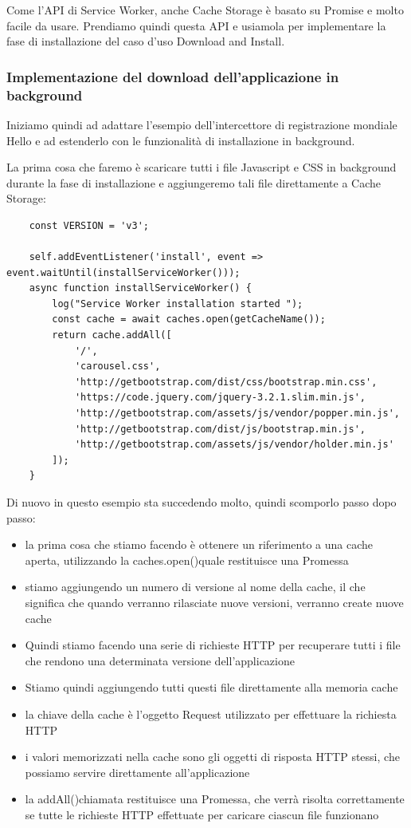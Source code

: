 \documentclass[italian]{article}
\begin{document}
Come l'API di Service Worker, anche Cache Storage è basato su Promise e molto facile da usare. Prendiamo quindi questa API e usiamola per implementare la fase di installazione del caso d'uso Download and Install.
\subsubsection{Implementazione del download dell'applicazione in background}
Iniziamo quindi ad adattare l'esempio dell'intercettore di registrazione mondiale Hello e ad estenderlo con le funzionalità di installazione in background.

La prima cosa che faremo è scaricare tutti i file Javascript e CSS in background durante la fase di installazione e aggiungeremo tali file direttamente a Cache Storage:

\begin{lstlisting}
	const VERSION = 'v3';

	self.addEventListener('install', event => event.waitUntil(installServiceWorker()));
	async function installServiceWorker() {
		log("Service Worker installation started ");
		const cache = await caches.open(getCacheName());
		return cache.addAll([
			'/',
			'carousel.css',
			'http://getbootstrap.com/dist/css/bootstrap.min.css',
			'https://code.jquery.com/jquery-3.2.1.slim.min.js',
			'http://getbootstrap.com/assets/js/vendor/popper.min.js',
			'http://getbootstrap.com/dist/js/bootstrap.min.js',
			'http://getbootstrap.com/assets/js/vendor/holder.min.js'
		]);
	}
\end{lstlisting}
Di nuovo in questo esempio sta succedendo molto, quindi scomporlo passo dopo passo:
\begin{itemize}
\item la prima cosa che stiamo facendo è ottenere un riferimento a una cache aperta, utilizzando la caches.open()quale restituisce una Promessa
\item stiamo aggiungendo un numero di versione al nome della cache, il che significa che quando verranno rilasciate nuove versioni, verranno create nuove cache
\item Quindi stiamo facendo una serie di richieste HTTP per recuperare tutti i file che rendono una determinata versione dell'applicazione
\item Stiamo quindi aggiungendo tutti questi file direttamente alla memoria cache
\item la chiave della cache è l'oggetto Request utilizzato per effettuare la richiesta HTTP
\item i valori memorizzati nella cache sono gli oggetti di risposta HTTP stessi, che possiamo servire direttamente all'applicazione
\item la addAll()chiamata restituisce una Promessa, che verrà risolta correttamente se tutte le richieste HTTP effettuate per caricare ciascun file funzionano
\end{itemize}
\end{document}
